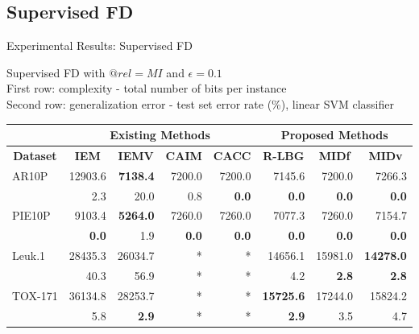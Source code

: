 \documentclass{beamer}
\begin{document}
\subsection[Unsupervised FD]{Supervised FD}
\begin{frame}{Experimental Results: Supervised FD}
\begin{table} [t]
\scriptsize{Supervised FD with $@rel=MI$ and $\epsilon=0.1$ \\ 
First row: complexity - total number of bits per instance\\ 
Second row: generalization error - test set error rate (\%), linear SVM classifier} \\ \vspace{2mm}
\centering \scriptsize
\begin{tabular}{l|r|r|r|r|r|r|r|}
   \cline{2-8}
    & \multicolumn{4}{|c|}{\textbf{Existing Methods}} & \multicolumn{3}{|c|}{\textbf{Proposed Methods}} \\ \hline

   \multicolumn{1}{|c|}{\textbf{Dataset}} & \multicolumn{1}{|c|}{\textbf{IEM}} & \multicolumn{1}{|c|}{\textbf{IEMV}} & \multicolumn{1}{|c|}{\textbf{CAIM}} & \multicolumn{1}{|c|}{\textbf{CACC}} & \multicolumn{1}{|c|}{\textbf{R-LBG}} & \multicolumn{1}{|c|}{\textbf{MIDf}} & \multicolumn{1}{|c|}{\textbf{MIDv}}  \\ \hline
   
 \multicolumn{1}{|l|}{AR10P}   & 12903.6 & \textbf{7138.4} & 7200.0 & 7200.0 & 7145.6 & 7200.0 & 7266.3 \\ \cline{2-8}
   \multicolumn{1}{|l|}{ }    & 2.3 & 20.0 & 0.8 & \textbf{0.0} & \textbf{0.0} & \textbf{0.0} & \textbf{0.0} \\ \hline

   \multicolumn{1}{|l|}{PIE10P} & 9103.4 & \textbf{5264.0} & 7260.0 & 7260.0 & 7077.3 & 7260.0 & 7154.7 \\ \cline{2-8}
   \multicolumn{1}{|l|}{ }     & \textbf{0.0} & 1.9 & \textbf{0.0} & \textbf{0.0} & \textbf{0.0} & \textbf{0.0} & \textbf{0.0} \\ \hline

   \multicolumn{1}{|l|}{Leuk.1}   & 28435.3 & 26034.7 & * &* & 14656.1 & 15981.0 & \textbf{14278.0} \\ \cline{2-8}
   \multicolumn{1}{|l|}{ }     & 40.3 & 56.9 & * & * & 4.2 & \textbf{2.8} & \textbf{2.8} \\ \hline

   \multicolumn{1}{|l|}{TOX-171}   & 36134.8 & 28253.7 & * & * & \textbf{15725.6} & 17244.0 & 15824.2 \\ \cline{2-8}
   \multicolumn{1}{|l|}{ }     & 5.8 & \textbf{2.9} & * & * & \textbf{2.9} & 3.5 & 4.7  \\ \hline


\end{tabular}
\end{table}
\end{frame}
\end{document}
